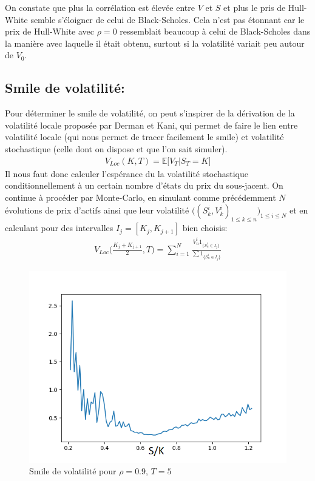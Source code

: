 \documentclass{report}
\begin{document}
On constate que plus la corrélation est élevée entre $V$ et $S$ et plus le pris de Hull-White semble s'éloigner de celui de Black-Scholes. Cela n'est pas étonnant car le prix de Hull-White avec $\rho = 0$ ressemblait beaucoup à celui de Black-Scholes dans la manière avec laquelle il était obtenu, surtout si la volatilité variait peu autour de $V_0$.

\subsection*{Smile de volatilité:}
Pour déterminer le smile de volatilité, on peut s'inspirer de la dérivation de la volatilité locale proposée par Derman et Kani, qui permet de faire le lien entre volatilité locale (qui nous permet de tracer facilement le smile) et volatilité stochastique (celle dont on dispose et que l'on sait simuler).
\begin{eqnarray*}
V_{Loc}(K, T) = \mathbb{E}\big[V_T | S_T = K]
\end{eqnarray*}
Il nous faut donc calculer l'espérance du la volatilité stochastique conditionnellement à un certain nombre d'états du prix du sous-jacent. On continue à procéder par Monte-Carlo, en simulant comme précédemment $N$ évolutions de prix d'actifs ainsi que leur volatilité $\big((S^i_k, V^i_k)_{1\leq k\leq n}\big)_{1\leq i\leq N}$ et en calculant pour des intervalles $I_j = [K_j, K_{j+1}]$ bien choisis:
\begin{eqnarray*}
V_{Loc}\Big(\frac{K_j + K_{j+1}}{2}, T\Big) = \sum\limits_{i=1}^N\frac{V^i_n 1_{\{S^i_n \in I_j\}}}{\sum{1_{\{S^i_n \in I_j\}}}}
\end{eqnarray*}

\begin{figure}[H]
\begin{center}
\includegraphics[scale=0.7]{smile01.png}
\end{center}
\caption{Smile de volatilité pour $\rho = 0.9$, $T = 5$}
\end{figure} 
\end{document}
